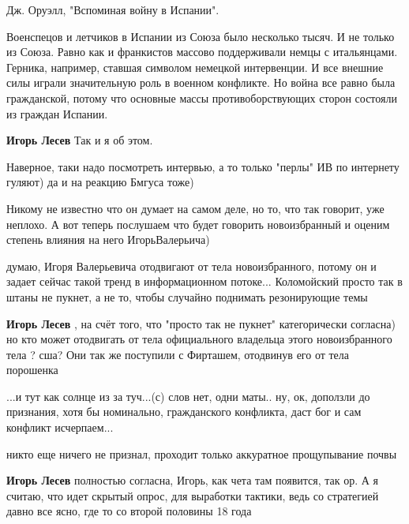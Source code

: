 \begin{itemize}
Дж. Оруэлл, "Вспоминая войну в Испании".

\begin{itemize} %

Военспецов и летчиков в Испании из Союза было несколько тысяч. И не только из
Союза. Равно как и франкистов массово поддерживали немцы с итальянцами.
Герника, например, ставшая символом немецкой интервенции. И все внешние силы
играли значительную роль в военном конфликте. Но война все равно была
гражданской, потому что основные массы противоборствующих сторон состояли из
граждан Испании.


\textbf{Игорь Лесев} Так и я об этом.

\end{itemize} %


Наверное, таки надо посмотреть интервью, а то только "перлы" ИВ по интернету
гуляют) да и на реакцию Бмгуса тоже)

Никому не известно что он думает на самом деле, но то, что так говорит, уже
неплохо. А вот теперь послушаем что будет говорить новоизбранный и оценим
степень влияния на него ИгорьВалерьича)

\begin{itemize} %

думаю, Игоря Валерьевича отодвигают от тела новоизбранного, потому он и задает
сейчас такой тренд в информационном потоке... Коломойский просто так в штаны не
пукнет, а не то, чтобы случайно поднимать резонирующие темы


\textbf{Игорь Лесев} , на счёт того, что "просто так не пукнет" категорически согласна) но кто может отодвигать от тела официального владельца этого новоизбранного тела ? сша? Они так же поступили с Фирташем, отодвинув его от тела порошенка
\end{itemize} %


...и тут как солнце из за туч...(с) слов нет, одни маты.. ну, ок, доползли до
признания, хотя бы номинально, гражданского конфликта, даст бог и сам конфликт
исчерпаем...

\begin{itemize} %
никто еще ничего не признал, проходит только аккуратное прощупывание почвы

\textbf{Игорь Лесев} полностью согласна, Игорь, как чета там появится, так ор. А я считаю, что идет скрытый опрос, для выработки тактики, ведь со стратегией давно все ясно, где то со второй половины 18 года
\end{itemize} %


\end{itemize}
